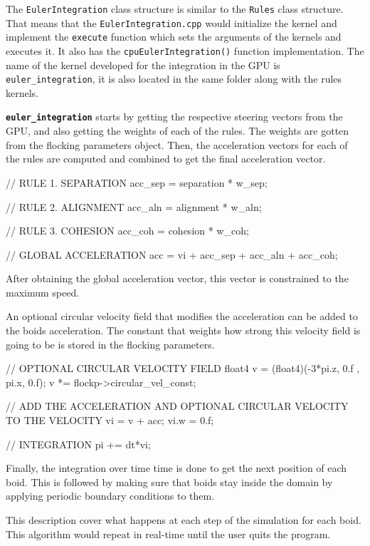 The \texttt{EulerIntegration} class structure is similar to the \texttt{Rules} class structure. That means that the \texttt{EulerIntegration.cpp} would initialize the kernel and implement the \texttt{execute} function which sets the arguments of the kernels and executes it. It also has the \texttt{cpuEulerIntegration()} function implementation. The name of the kernel developed for the integration in the GPU is \texttt{euler\_integration}, it is also located in the same folder along with the rules kernels.

\texttt{\textbf{euler\_integration}} starts by getting the respective steering vectors from the GPU, and also getting the weights of each of the rules. The weights are gotten from the flocking parameters object. Then, the acceleration vectors for each of the rules are computed and combined to get the final acceleration vector.

\begin{cppcode}{0}
// RULE 1. SEPARATION
acc_sep = separation * w_sep;
   
// RULE 2. ALIGNMENT
acc_aln = alignment * w_aln;

// RULE 3. COHESION
acc_coh = cohesion * w_coh;

// GLOBAL ACCELERATION
acc = vi + acc_sep + acc_aln + acc_coh;
\end{cppcode}

After obtaining the global acceleration vector, this vector is constrained to the maximum speed. 

An optional circular velocity field that modifies the acceleration can be added to the boids acceleration. The constant that weights how strong this velocity field is going to be is stored in the flocking parameters.

\begin{cppcode}{0}
// OPTIONAL CIRCULAR VELOCITY FIELD
float4 v = (float4)(-3*pi.z, 0.f , pi.x, 0.f);
v *= flockp->circular_vel_const;

// ADD THE ACCELERATION AND OPTIONAL CIRCULAR VELOCITY TO THE VELOCITY
vi = v + acc;
vi.w = 0.f;

// INTEGRATION
pi += dt*vi; 
\end{cppcode}

Finally, the integration over time time is done to get the next position of each boid. This is followed by making sure that boids stay inside the domain by applying periodic boundary conditions to them. 

This description cover what happens at each step of the simulation for each boid. This algorithm would repeat in real-time until the user quits the program.

